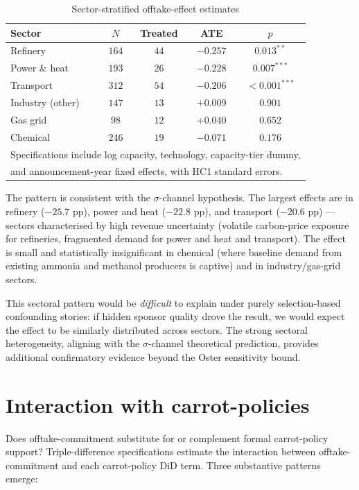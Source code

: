 \begin{table}[h]
\centering
\caption{Sector-stratified offtake-effect estimates}
\label{tab:offtake_sector}
\begin{tabular}{lcccc}
\toprule
Sector & $N$ & Treated & ATE & $p$ \\
\midrule
Refinery     & $164$ & $44$ & $-0.257$ & $0.013^{**}$ \\
Power \& heat & $193$ & $26$ & $-0.228$ & $0.007^{***}$ \\
Transport    & $312$ & $54$ & $-0.206$ & $<0.001^{***}$ \\
Industry (other) & $147$ & $13$ & $+0.009$ & $0.901$ \\
Gas grid     & $98$  & $12$ & $+0.040$ & $0.652$ \\
Chemical     & $246$ & $19$ & $-0.071$ & $0.176$ \\
\bottomrule
\multicolumn{5}{l}{\footnotesize Specifications include log capacity, technology, capacity-tier dummy,} \\
\multicolumn{5}{l}{\footnotesize and announcement-year fixed effects, with HC1 standard errors.} \\
\end{tabular}
\end{table}

The pattern is consistent with the $\sigma$-channel hypothesis. The largest effects are in refinery ($-25.7$ pp), power and heat ($-22.8$ pp), and transport ($-20.6$ pp) --- sectors characterised by high revenue uncertainty (volatile carbon-price exposure for refineries, fragmented demand for power and heat and transport). The effect is small and statistically insignificant in chemical (where baseline demand from existing ammonia and methanol producers is captive) and in industry/gas-grid sectors.

This sectoral pattern would be \emph{difficult} to explain under purely selection-based confounding stories: if hidden sponsor quality drove the result, we would expect the effect to be similarly distributed across sectors. The strong sectoral heterogeneity, aligning with the $\sigma$-channel theoretical prediction, provides additional confirmatory evidence beyond the Oster sensitivity bound.

\section{Interaction with carrot-policies}
\label{sec:offtake_policy_interaction}

Does offtake-commitment substitute for or complement formal carrot-policy support? Triple-difference specifications estimate the interaction between offtake-commitment and each carrot-policy DiD term. Three substantive patterns emerge:

